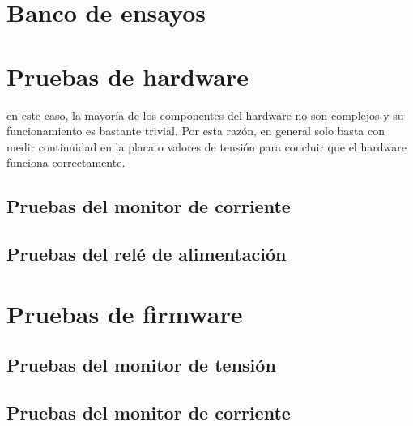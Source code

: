 \section{Banco de ensayos}



\section{Pruebas de hardware}
\label{sec:pruebasHW}


en este caso, la mayoría de los componentes del hardware no son complejos y su funcionamiento es bastante trivial. Por esta razón, en general solo basta con medir continuidad en la placa o valores de tensión para concluir que el hardware funciona correctamente.

\subsection{Pruebas del monitor de corriente}



\subsection{Pruebas del relé de alimentación}



\section{Pruebas de firmware}
\label{sec:pruebasFW}

\subsection{Pruebas del monitor de tensión}



\subsection{Pruebas del monitor de corriente}




